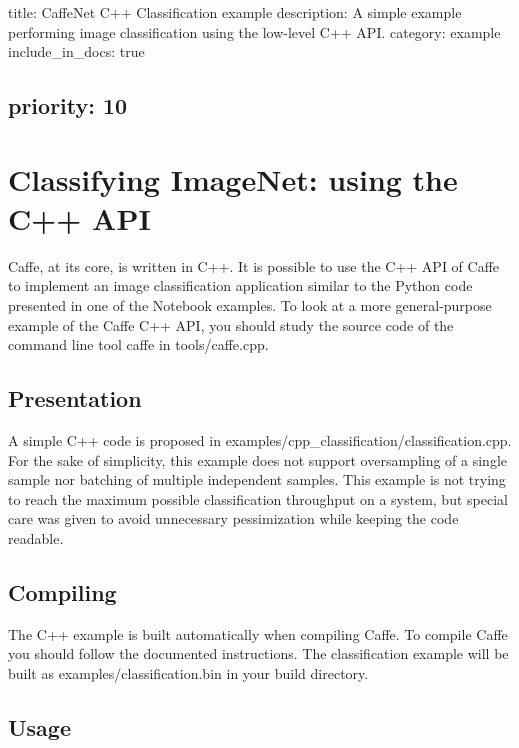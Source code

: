 

 title\+: Caffe\+Net C++ Classification example description\+: A simple example performing image classification using the low-\/level C++ A\+PI. category\+: example include\+\_\+in\+\_\+docs\+: true \subsection*{priority\+: 10 }

\section*{Classifying Image\+Net\+: using the C++ A\+PI}

Caffe, at its core, is written in C++. It is possible to use the C++ A\+PI of Caffe to implement an image classification application similar to the Python code presented in one of the Notebook examples. To look at a more general-\/purpose example of the Caffe C++ A\+PI, you should study the source code of the command line tool {\ttfamily caffe} in {\ttfamily tools/caffe.\+cpp}.

\subsection*{Presentation}

A simple C++ code is proposed in {\ttfamily examples/cpp\+\_\+classification/classification.\+cpp}. For the sake of simplicity, this example does not support oversampling of a single sample nor batching of multiple independent samples. This example is not trying to reach the maximum possible classification throughput on a system, but special care was given to avoid unnecessary pessimization while keeping the code readable.

\subsection*{Compiling}

The C++ example is built automatically when compiling Caffe. To compile Caffe you should follow the documented instructions. The classification example will be built as {\ttfamily examples/classification.\+bin} in your build directory.

\subsection*{Usage}

